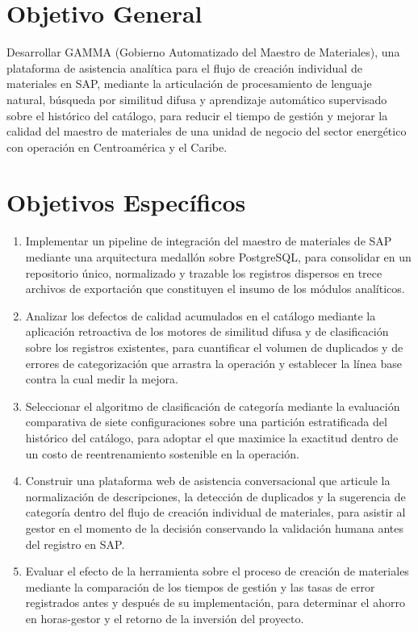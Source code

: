 \section{Objetivo General}
Desarrollar GAMMA (Gobierno Automatizado del Maestro de Materiales), una plataforma de asistencia analítica para el flujo de creación individual de materiales en SAP, mediante la articulación de procesamiento de lenguaje natural, búsqueda por similitud difusa y aprendizaje automático supervisado sobre el histórico del catálogo, para reducir el tiempo de gestión y mejorar la calidad del maestro de materiales de una unidad de negocio del sector energético con operación en Centroamérica y el Caribe.

\section{Objetivos Específicos}
\begin{enumerate}
	\item Implementar un pipeline de integración del maestro de materiales de SAP mediante una arquitectura medallón sobre PostgreSQL, para consolidar en un repositorio único, normalizado y trazable los registros dispersos en trece archivos de exportación que constituyen el insumo de los módulos analíticos.

	\item Analizar los defectos de calidad acumulados en el catálogo mediante la aplicación retroactiva de los motores de similitud difusa y de clasificación sobre los registros existentes, para cuantificar el volumen de duplicados y de errores de categorización que arrastra la operación y establecer la línea base contra la cual medir la mejora.

	\item Seleccionar el algoritmo de clasificación de categoría mediante la evaluación comparativa de siete configuraciones sobre una partición estratificada del histórico del catálogo, para adoptar el que maximice la exactitud dentro de un costo de reentrenamiento sostenible en la operación.

	\item Construir una plataforma web de asistencia conversacional que articule la normalización de descripciones, la detección de duplicados y la sugerencia de categoría dentro del flujo de creación individual de materiales, para asistir al gestor en el momento de la decisión conservando la validación humana antes del registro en SAP.

	\item Evaluar el efecto de la herramienta sobre el proceso de creación de materiales mediante la comparación de los tiempos de gestión y las tasas de error registrados antes y después de su implementación, para determinar el ahorro en horas-gestor y el retorno de la inversión del proyecto.
\end{enumerate}
